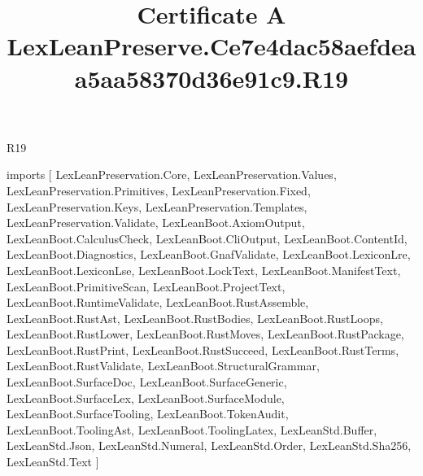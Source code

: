 \begin{lexlean}{R19}
\title{Certificate A LexLeanPreserve.Ce7e4dac58aefdeaa5aa58370d36e91c9.R19}
\begin{coremodule}
imports [
  LexLeanPreservation.Core,
  LexLeanPreservation.Values,
  LexLeanPreservation.Primitives,
  LexLeanPreservation.Fixed,
  LexLeanPreservation.Keys,
  LexLeanPreservation.Templates,
  LexLeanPreservation.Validate,
  LexLeanBoot.AxiomOutput,
  LexLeanBoot.CalculusCheck,
  LexLeanBoot.CliOutput,
  LexLeanBoot.ContentId,
  LexLeanBoot.Diagnostics,
  LexLeanBoot.GnafValidate,
  LexLeanBoot.LexiconLre,
  LexLeanBoot.LexiconLse,
  LexLeanBoot.LockText,
  LexLeanBoot.ManifestText,
  LexLeanBoot.PrimitiveScan,
  LexLeanBoot.ProjectText,
  LexLeanBoot.RuntimeValidate,
  LexLeanBoot.RustAssemble,
  LexLeanBoot.RustAst,
  LexLeanBoot.RustBodies,
  LexLeanBoot.RustLoops,
  LexLeanBoot.RustLower,
  LexLeanBoot.RustMoves,
  LexLeanBoot.RustPackage,
  LexLeanBoot.RustPrint,
  LexLeanBoot.RustSucceed,
  LexLeanBoot.RustTerms,
  LexLeanBoot.RustValidate,
  LexLeanBoot.StructuralGrammar,
  LexLeanBoot.SurfaceDoc,
  LexLeanBoot.SurfaceGeneric,
  LexLeanBoot.SurfaceLex,
  LexLeanBoot.SurfaceModule,
  LexLeanBoot.SurfaceTooling,
  LexLeanBoot.TokenAudit,
  LexLeanBoot.ToolingAst,
  LexLeanBoot.ToolingLatex,
  LexLeanStd.Buffer,
  LexLeanStd.Json,
  LexLeanStd.Numeral,
  LexLeanStd.Order,
  LexLeanStd.Sha256,
  LexLeanStd.Text
]


\end{coremodule}
\end{lexlean}
